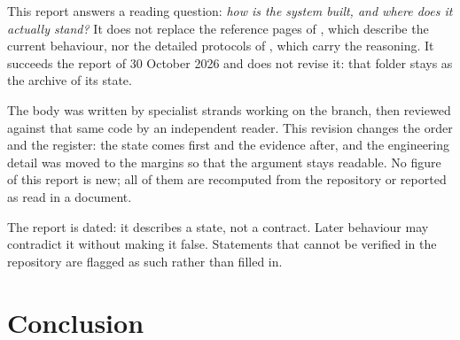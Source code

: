 \documentclass[11pt,a4paper]{article}
\DeclareRobustCommand{\code}[1]{{\small\path{#1}}}
\begin{document}
This report answers a reading question: \emph{how is the system built, and where
does it actually stand?} It does not replace the reference pages of \code{docs/},
which describe the current behaviour, nor the detailed protocols of
\code{research/}, which carry the reasoning. It succeeds the report of
30 October 2026 and does not revise it: that folder stays as the archive of its
state.

The body was written by specialist strands working on the \code{dev/1} branch, then
reviewed against that same code by an independent reader. This revision changes
the order and the register: the state comes first and the evidence after, and the
engineering detail was moved to the margins so that the argument stays readable.
No figure of this report is new; all of them are recomputed from the repository or
reported as read in a document.

The report is dated: it describes a state, not a contract. Later behaviour may
contradict it without making it false. Statements that cannot be verified in the
repository are flagged as such rather than filled in.







\section{Conclusion}

\end{document}
